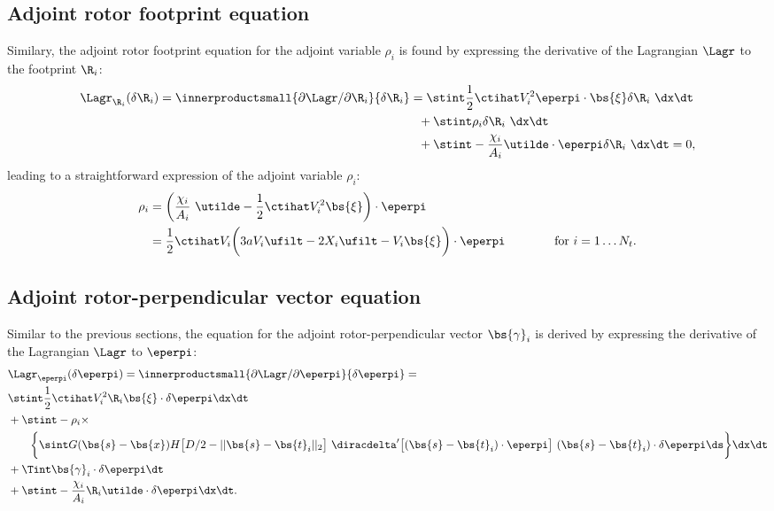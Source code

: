 \subsection{Adjoint rotor footprint equation}
Similary, the adjoint rotor footprint equation for the adjoint variable $\rho_i$ is found by expressing the derivative of the Lagrangian $\Lagr$ to the footprint $\R_i$: 
\begin{align}
\Lagr_{\R_i}(\delta \R_i) = \innerproductsmall{\partial \Lagr / \partial \R_i}{\delta \R_i} &= 
\stint \frac{1}{2} \ctihat V_i^2 \eperpi \cdot \bs{\xi} \delta \R_i ~\dx \dt \nonumber \\
& \ \ + \stint \rho_i \delta \R_i ~\dx \dt \nonumber \\
& \ \ + \stint -\frac{\chi_i}{A_i} \utilde \cdot \eperpi \delta \R_i ~\dx \dt = 0,
\end{align}    
leading to a straightforward expression of the adjoint variable $\rho_i$:
\begin{align}
\rho_i &= \bigg( \frac{\chi_i}{A_i}~\utilde - \frac{1}{2} \ctihat V_i^2 \bs{\xi} \bigg) \cdot \eperpi \label{eq:rho_i_1}  \\
 &= \frac{1}{2} \ctihat V_i \bigg(3aV_i \ufilt  -2 X_i \ufilt - V_i\bs{\xi} \bigg) \cdot \eperpi \qquad\qquad \text{for } i=1\dots N_t. \label{eq:rho_i}
\end{align}

\subsection{Adjoint rotor-perpendicular vector equation}
Similar to the previous sections, the equation for the adjoint rotor-perpendicular vector $\bs{\gamma}_i$ is derived by expressing the derivative of the Lagrangian $\Lagr$ to $\eperpi$:
{\small
\begin{align}
&\Lagr_{\eperpi}(\delta \eperpi) =\innerproductsmall {\partial \Lagr / \partial \eperpi}{\delta \eperpi} = \nonumber \\
& \stint \frac{1}{2} \ctihat V_i^2 \R_i \bs{\xi} \cdot \delta \eperpi \dx \dt \nonumber \\
& + \stint - \rho_i \times \nonumber \\
& \qquad \bigg\{ \sint G(\bs{s} - \bs{x})  H\big[D/2 - \vert\vert \bs{s} - \bs{t}_i \vert\vert_2 \big]~\diracdelta'\big[(\bs{s} - \bs{t}_i) \cdot \eperpi \big]~(\bs{s} - \bs{t}_i) \cdot \delta \eperpi \ds \bigg\} \dx \dt \nonumber\\
& + \Tint \bs{\gamma}_i \cdot \delta \eperpi \dt \nonumber \\ 
& + \stint -\frac{\chi_i}{A_i} \R_i \utilde \cdot \delta \eperpi \dx \dt \label{eq:app_adj_perp1}.
\end{align}}


